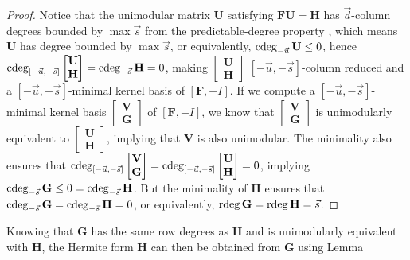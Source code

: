 \begin{proof}
Notice that the unimodular matrix $\mathbf{U}$ satisfying $\mathbf{F}\mathbf{U}=\mathbf{H}$
has $\vec{d}$-column degrees bounded by $\max\vec{s}$ from the predictable-degree
property , which means $\mathbf{U}$
has degree bounded by $\max\vec{s}$, or equivalently, $\cdeg_{-\vec{u}}\mathbf{U}\le0$,
hence $\cdeg_{\left[-\vec{u},-\vec{s}\right]}\begin{bmatrix}\mathbf{U}\\
\mathbf{H}
\end{bmatrix}=\cdeg_{-\vec{s}}\mathbf{H}=0$, making $\begin{bmatrix}\mathbf{U}\\
\mathbf{H}
\end{bmatrix}$ $\left[-\vec{u},-\vec{s}\right]$-column reduced and a $\left[-\vec{u},-\vec{s}\right]$-minimal
kernel basis of $\left[\mathbf{F},-I\right]$. If we compute a $\left[-\vec{u},-\vec{s}\right]$-minimal
kernel basis $\begin{bmatrix}\mathbf{V}\\
\mathbf{G}
\end{bmatrix}$ of $\left[\mathbf{F},-I\right]$, we know that $\begin{bmatrix}\mathbf{V}\\
\mathbf{G}
\end{bmatrix}$ is unimodularly equivalent to $\begin{bmatrix}\mathbf{U}\\
\mathbf{H}
\end{bmatrix}$, implying that $\mathbf{V}$ is also unimodular. The minimality also
ensures that $\cdeg_{\left[-\vec{u},-\vec{s}\right]}\begin{bmatrix}\mathbf{V}\\
\mathbf{G}
\end{bmatrix}=\cdeg_{\left[-\vec{u},-\vec{s}\right]}\begin{bmatrix}\mathbf{U}\\
\mathbf{H}
\end{bmatrix}=0$, implying $\cdeg_{-\vec{s}}\mathbf{G}\le0=\cdeg_{-\vec{s}}\mathbf{H}$.
But the minimality of $\mathbf{H}$ ensures that $\cdeg_{-\vec{s}}\mathbf{G}=\cdeg_{-\vec{s}}\mathbf{H}=0$,
or equivalently, $\rdeg\mathbf{G}=\rdeg\mathbf{H}=\vec{s}$.
\end{proof}
Knowing that $\mathbf{G}$ has the same row degrees as $\mathbf{H}$
and is unimodularly equivalent with $\mathbf{H}$, the Hermite form
$\mathbf{H}$ can then be obtained from $\mathbf{G}$ using Lemma
